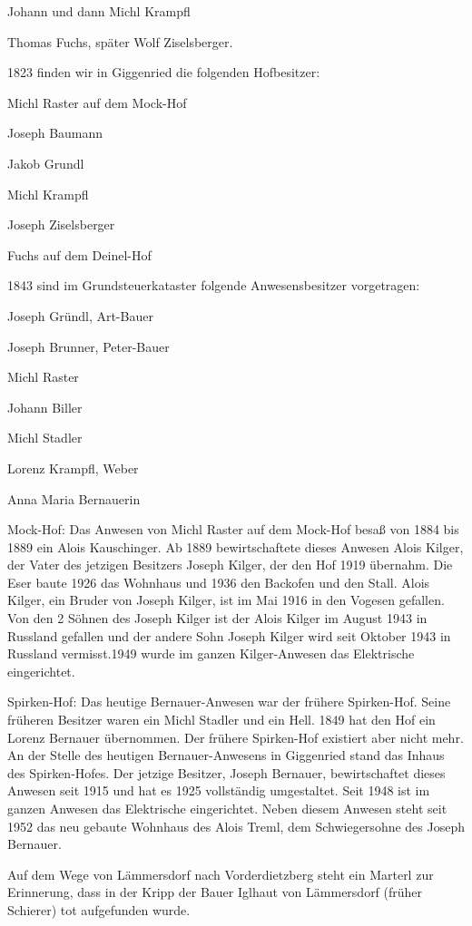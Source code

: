 \documentclass[12pt,a4pager]{book}
\begin{document}
Johann und dann Michl Krampfl

Thomas Fuchs, später Wolf Ziselsberger.

1823 finden wir in Giggenried die folgenden Hofbesitzer:

Michl Raster auf dem Mock-Hof

Joseph Baumann

Jakob Grundl

Michl Krampfl

Joseph Ziselsberger

Fuchs auf dem Deinel-Hof

1843 sind im Grundsteuerkataster folgende Anwesensbesitzer vorgetragen:

Joseph Gründl, Art-Bauer

Joseph Brunner, Peter-Bauer

Michl Raster

Johann Biller

Michl Stadler

Lorenz Krampfl, Weber

Anna Maria Bernauerin

Mock-Hof: Das Anwesen von Michl Raster auf dem Mock-Hof besaß von 1884 bis 1889
ein Alois Kauschinger. Ab 1889 bewirtschaftete dieses Anwesen Alois Kilger, der
Vater des jetzigen Besitzers Joseph Kilger, der den Hof 1919 übernahm. Die Eser
baute 1926 das Wohnhaus und 1936 den Backofen und den Stall. Alois Kilger, ein
Bruder von Joseph Kilger, ist im Mai 1916 in den Vogesen gefallen. Von den 2
Söhnen des Joseph Kilger ist der Alois Kilger im August 1943 in Russland
gefallen und der andere Sohn Joseph Kilger wird seit Oktober 1943 in Russland
vermisst.1949 wurde im ganzen Kilger-Anwesen das Elektrische eingerichtet.

Spirken-Hof: Das heutige Bernauer-Anwesen war der frühere Spirken-Hof. Seine
früheren Besitzer waren ein Michl Stadler und ein Hell. 1849 hat den Hof ein
Lorenz Bernauer übernommen. Der frühere Spirken-Hof existiert aber nicht mehr.
An der Stelle des heutigen Bernauer-Anwesens in Giggenried stand das Inhaus des
Spirken-Hofes. Der jetzige Besitzer, Joseph Bernauer, bewirtschaftet dieses
Anwesen seit 1915 und hat es 1925 vollständig umgestaltet. Seit 1948 ist im
ganzen Anwesen das Elektrische eingerichtet. Neben diesem Anwesen steht seit
1952 das neu gebaute Wohnhaus des Alois Treml, dem Schwiegersohne des Joseph
Bernauer.

Auf dem Wege von Lämmersdorf nach Vorderdietzberg steht ein Marterl zur
Erinnerung, dass in der Kripp der Bauer Iglhaut von Lämmersdorf (früher
Schierer) tot aufgefunden wurde.
\end{document}
